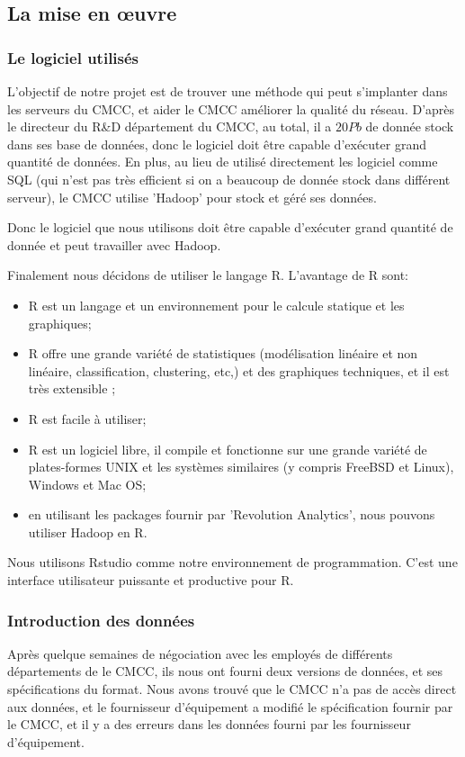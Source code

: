 \subsection{La mise en \oe uvre}
\subsubsection{Le logiciel utilisés}
L'objectif de notre projet est de trouver une méthode qui peut s'implanter dans les serveurs du CMCC, et aider le CMCC améliorer la qualité du réseau. D'après le directeur du R\&D département du CMCC, au total, il a $20Pb$ de donnée stock dans ses base de données, donc le logiciel doit être capable d'exécuter grand quantité de données. En plus,  au lieu de utilisé directement les logiciel comme SQL (qui n'est pas très efficient si on a beaucoup de donnée stock dans différent serveur), le CMCC utilise 'Hadoop' pour stock et géré ses données.

Donc le logiciel que nous utilisons doit être capable d'exécuter grand quantité de donnée et peut travailler avec Hadoop. 

Finalement nous décidons de utiliser le langage \textsf{R}. L'avantage de R sont:

\begin{itemize}
\item R est un langage et un environnement pour le calcule statique et les graphiques; 
\item R offre une grande variété de statistiques (modélisation linéaire et non linéaire, classification, clustering, etc,) et des graphiques techniques, et il est très extensible ;
\item R est facile à utiliser; 
\item R est un logiciel libre, il compile et fonctionne sur une grande variété de plates-formes UNIX et les systèmes similaires (y compris FreeBSD et Linux), Windows et Mac OS;
\item en utilisant les packages fournir par 'Revolution Analytics', nous pouvons utiliser Hadoop en R.
\end{itemize}

Nous utilisons \textsf{Rstudio} comme notre environnement de programmation. C'est une interface utilisateur puissante et productive pour R.

\subsubsection{Introduction des données}
Après quelque semaines de négociation avec les employés de différents départements de le CMCC, ils nous ont fourni deux versions de données, et ses spécifications du format\cite{specifi}. Nous avons trouvé que le CMCC n'a pas de accès direct aux données, et le fournisseur d'équipement a modifié le spécification fournir par le CMCC, et il y a des erreurs dans les données fourni par les fournisseur d'équipement.

